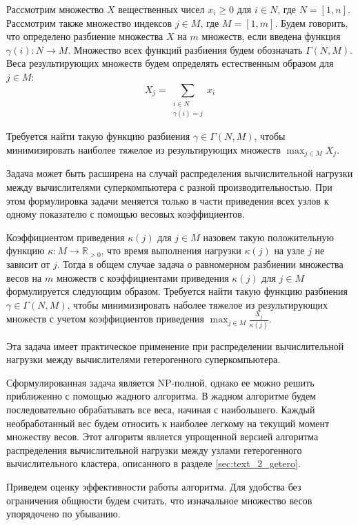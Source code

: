 Рассмотрим множество $X$ вещественных чисел $x_i \ge 0$ для $i \in N$, где $N = [1, n]$.
Рассмотрим также множество индексов $j \in M$, где $M = [1, m]$.
Будем говорить, что определено разбиение множества $X$ на $m$ множеств, если введена функция $\gamma(i): N \rightarrow M$.
Множество всех функций разбиения будем обозначать $\Gamma(N, M)$.
Веса результирующих множеств будем определять естественным образом для $j \in M$:
\begin{equation}
	X_j = \sum_{\substack{i \in N \\ \gamma(i) = j}}{x_i}
\end{equation}

Требуется найти такую функцию разбиения $\gamma \in \Gamma(N, M)$, чтобы минимизировать наиболее тяжелое из результирующих множеств $\max_{j \in M}{X_j}$.

Задача может быть расширена на случай распределения вычислительной нагрузки между вычислителями суперкомпьютера с разной производительностью.
При этом формулировка задачи меняется только в части приведения всех узлов к одному показателю с помощью весовых коэффициентов.

Коэффициентом приведения $\kappa(j)$ для $j \in M$ назовем такую положительную функцию $\kappa: M \rightarrow \mathbb{R}_{>0}$, что время выполнения нагрузки $\kappa(j)$ на узле $j$ не зависит от $j$.
Тогда в общем случае задача о равномерном разбиении множества весов на $m$ множеств с коэффициентами приведения $\kappa(j)$ для $j \in M$ формулируется следующим образом.
Требуется найти такую функцию разбиения $\gamma \in \Gamma(N, M)$, чтобы минимизировать наболее тяжелое из результирующих множеств с учетом коэффициентов приведения $\max_{j \in M}{ \frac{X_j}{\kappa(j)} }$.

Эта задача имеет практическое применение при распределении вычислительной нагрузки между вычислителями гетерогенного суперкомпьютера\label{term:cluster_getero2}.

Сформулированная задача является NP-полной, однако ее можно решить приближенно с помощью жадного алгоритма.
В жадном алгоритме будем последовательно обрабатывать все веса, начиная с наибольшего.
Каждый необработанный вес будем относить к наиболее легкому на текущий момент множеству весов.
Этот алгоритм является упрощенной версией алгоритма распределения вычислительной нагрузки между узлами гетерогенного вычислительного кластера, описанного в разделе \ref{sec:text_2_getero}.

Приведем оценку эффективности работы алгоритма.
Для удобства без ограничения общности будем считать, что изначальное множество весов упорядочено по убыванию.

